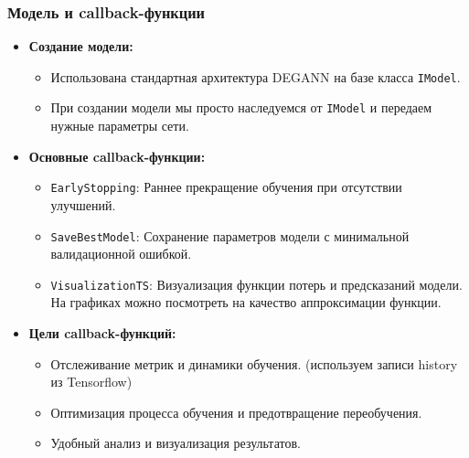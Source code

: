 \documentclass
  [ russian
  , aspectratio=1610 %
  ] {beamer}
\begin{document}
\begin{frame}
    \frametitle{Модель и callback-функции}
    \begin{itemize}
        \item \textbf{Создание модели:}
        \begin{itemize}
            \item Использована стандартная архитектура DEGANN на базе класса \texttt{IModel}.
            \item При создании модели мы просто наследуемся от \texttt{IModel} и передаем нужные параметры сети.
        \end{itemize}
        \item \textbf{Основные callback-функции:}
        \begin{itemize}
            \item \texttt{EarlyStopping}: Раннее прекращение обучения при отсутствии улучшений.
            \item \texttt{SaveBestModel}: Сохранение параметров модели с минимальной валидационной ошибкой.
            \item \texttt{VisualizationTS}: Визуализация функции потерь и предсказаний модели. На графиках можно посмотреть на качество аппроксимации функции.
        \end{itemize}
        \item \textbf{Цели callback-функций:}
        \begin{itemize}
            \item Отслеживание метрик и динамики обучения. (используем записи history из Tensorflow)
            \item Оптимизация процесса обучения и предотвращение переобучения.
            \item Удобный анализ и визуализация результатов.
        \end{itemize}
    \end{itemize}
\end{frame}
\end{document}
